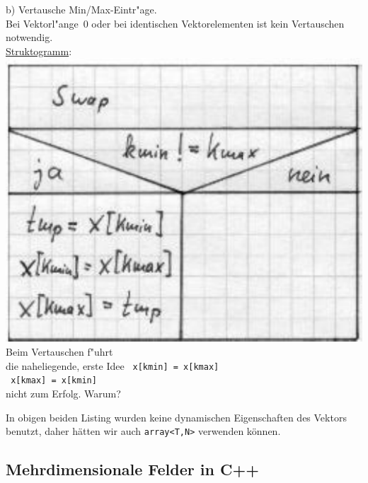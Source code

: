 \hfill
\begin{minipage}[t]{0.45\textwidth}
 b) Vertausche Min/Max-Eintr"age. \\ Bei Vektorl"ange~$0$ oder
 	bei identischen Vektorelementen ist kein Vertauschen notwendig.
 	\\[1ex]
\underline{Struktogramm}: \\
 \includegraphics[scale=0.7]{GIF/p49b}
 \\[1ex]
 Beim Vertauschen f"uhrt \\
 die naheliegende, erste Idee
 \verb| x[kmin] = x[kmax]| \\
 \verb| x[kmax] = x[kmin]| \\
 nicht zum Erfolg. Warum?
\end{minipage}
%
%
%
In obigen beiden Listing wurden keine dynamischen Eigenschaften des Vektors benutzt,
daher hätten wir auch \verb|array<T,N>| verwenden können.
%
%
\subsection{Mehrdimensionale Felder in C++}
\label{p:5.1.4}
%
